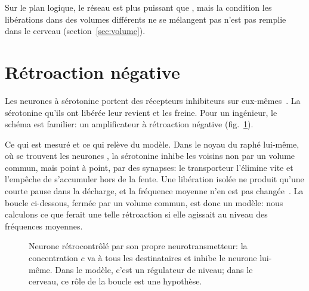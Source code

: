 Sur le plan logique, le réseau  est plus puissant que , mais la condition \og les libérations dans des volumes différents ne se mélangent pas\fg{} n'est pas remplie dans le cerveau (section~\ref{sec:volume}).

\section{Rétroaction négative}

Les neurones à sérotonine portent des récepteurs inhibiteurs sur eux-mêmes~\cite{Sprouse1987}. La sérotonine qu'ils ont libérée leur revient et les freine. Pour un ingénieur, le schéma est familier: un amplificateur à rétroaction négative (fig.~\ref{fig:serofeedback}).

Ce qui est mesuré et ce qui relève du modèle. Dans le noyau du raphé lui-même, où se trouvent les neurones , la sérotonine inhibe les voisins non par un volume commun, mais point à point, par des synapses: le transporteur l'élimine vite et l'empêche de s'accumuler hors de la fente. Une libération isolée ne produit qu'une courte pause dans la décharge, et la fréquence moyenne n'en est pas changée~\cite{CourtneyFord2016}. La boucle ci-dessous, fermée par un volume commun, est donc un modèle: nous calculons ce que ferait une telle rétroaction si elle agissait au niveau des fréquences moyennes.

\begin{figure}[t]
\centering
{}
\caption{Neurone  rétrocontrôlé par son propre neurotransmetteur: la concentration $c$ va à tous les destinataires et inhibe le neurone lui-même. Dans le modèle, c'est un régulateur de niveau; dans le cerveau, ce rôle de la boucle est une hypothèse.}
\label{fig:serofeedback}
\end{figure}


